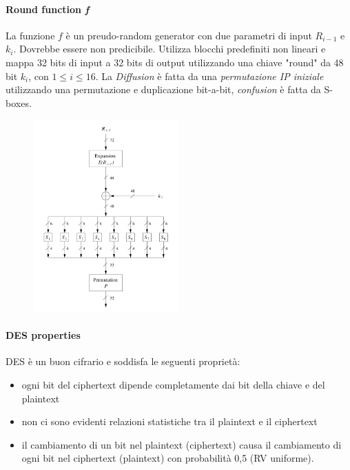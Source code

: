 \documentclass[a4paper,12pt]{article}
\begin{document}
\paragraph{Round function \textit{f}}
La funzione $f$ è un preudo-random generator con due parametri di input $R_{i-1}$ e $k_i$. Dovrebbe essere non predicibile. Utilizza blocchi predefiniti non lineari e mappa 32 bits di input a 32 bits di output utilizzando una chiave "round" da 48 bit $k_i$, con $1 \leq i \leq 16$.
La \textit{Diffusion} è fatta da una \textit{permutazione IP iniziale} utilizzando una permutazione e duplicazione bit-a-bit, \textit{confusion} è fatta da S-boxes.
\begin{figure}[H]
	\centering
	\includegraphics[width=0.5\textwidth]{img/round-func}
\end{figure}

\paragraph{DES properties}
DES è un buon cifrario e soddisfa le seguenti proprietà:
\begin{itemize}
	\item ogni bit del ciphertext dipende completamente dai bit della chiave e del plaintext
	\item non ci sono evidenti relazioni statistiche tra il plaintext e il ciphertext
	\item il cambiamento di un bit nel plaintext (ciphertext) causa il cambiamento di ogni bit nel ciphertext (plaintext) con probabilità 0,5 (RV uniforme).
\end{itemize}
\end{document}
